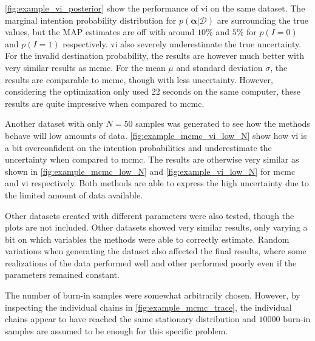 \cref{fig:example_vi_posterior} show the performance of \acrshort{vi} on the same dataset. The marginal intention probability distribution for $p(\boldsymbol{\alpha} | \mathcal{D})$ are surrounding the true values, but the MAP estimates are off with around $10\%$ and $5\%$ for $p(I=0)$ and $p(I=1)$ respectively. \acrshort{vi} also severely underestimate the true uncertainty. For the invalid destination probability, the results are however much better with very similar results as \acrshort{mcmc}. For the mean $\mu$ and standard deviation $\sigma$, the results are comparable to \acrshort{mcmc}, though with less uncertainty. However, considering the optimization only used 22 seconds on the same computer, these results are quite impressive when compared to \acrshort{mcmc}.

Another dataset with only $N=50$ samples was generated to see how the methods behave will low amounts of data. \cref{fig:example_mcmc_vi_low_N} show how \acrshort{vi} is a bit overconfident on the intention probabilities and underestimate the uncertainty when compared to \acrshort{mcmc}. The results are otherwise very similar as shown in \cref{fig:example_mcmc_low_N} and \cref{fig:example_vi_low_N} for \acrshort{mcmc} and \acrshort{vi} respectively. Both methods are able to express the high uncertainty due to the limited amount of data available. 

Other datasets created with different parameters were also tested, though the plots are not included. Other datasets showed very similar results, only varying a bit on which variables the methods were able to correctly estimate. Random variations when generating the dataset also affected the final results, where some realizations of the data performed well and other performed poorly even if the parameters remained constant. 

The number of burn-in samples were somewhat arbitrarily chosen. However, by inspecting the individual chains in \cref{fig:example_mcmc_trace}, the individual chains appear to have reached the same stationary distribution and $10000$ burn-in samples are assumed to be enough for this specific problem.

